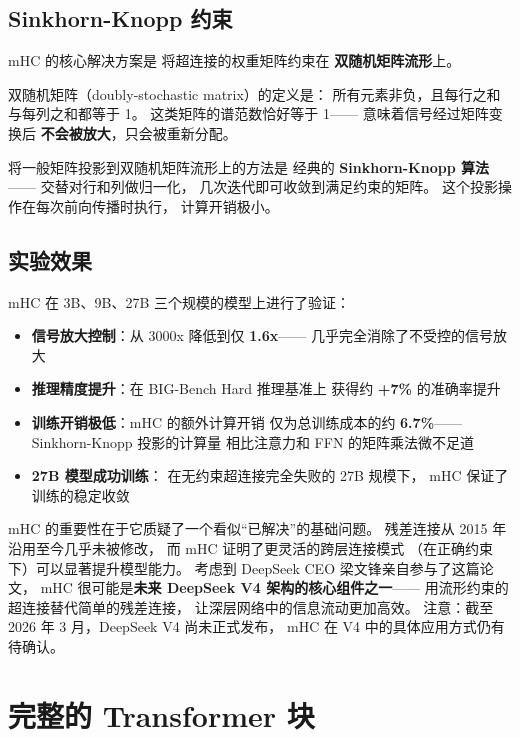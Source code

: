 \subsection{Sinkhorn-Knopp 约束}

mHC 的核心解决方案是
将超连接的权重矩阵约束在
\textbf{双随机矩阵流形}上。

双随机矩阵（doubly-stochastic matrix）的定义是：
所有元素非负，且每行之和与每列之和都等于 1。
这类矩阵的谱范数恰好等于 1——
意味着信号经过矩阵变换后
\textbf{不会被放大}，只会被重新分配。

将一般矩阵投影到双随机矩阵流形上的方法是
经典的 \textbf{Sinkhorn-Knopp 算法}——
交替对行和列做归一化，
几次迭代即可收敛到满足约束的矩阵。
这个投影操作在每次前向传播时执行，
计算开销极小。

\subsection{实验效果}

mHC 在 3B、9B、27B 三个规模的模型上进行了验证：

\begin{itemize}[noitemsep]
  \item \textbf{信号放大控制}：从 3000x 降低到仅 \textbf{1.6x}——
        几乎完全消除了不受控的信号放大
  \item \textbf{推理精度提升}：在 BIG-Bench Hard 推理基准上
        获得约 \textbf{+7\%} 的准确率提升
  \item \textbf{训练开销极低}：mHC 的额外计算开销
        仅为总训练成本的约 \textbf{6.7\%}——
        Sinkhorn-Knopp 投影的计算量
        相比注意力和 FFN 的矩阵乘法微不足道
  \item \textbf{27B 模型成功训练}：
        在无约束超连接完全失败的 27B 规模下，
        mHC 保证了训练的稳定收敛
\end{itemize}

\begin{corebox}
mHC 的重要性在于它质疑了一个看似``已解决''的基础问题。
残差连接从 2015 年沿用至今几乎未被修改，
而 mHC 证明了更灵活的跨层连接模式
（在正确约束下）可以显著提升模型能力。
考虑到 DeepSeek CEO 梁文锋亲自参与了这篇论文，
mHC 很可能是\textbf{未来 DeepSeek V4 架构的核心组件之一}——
用流形约束的超连接替代简单的残差连接，
让深层网络中的信息流动更加高效。
注意：截至 2026 年 3 月，DeepSeek V4 尚未正式发布，
mHC 在 V4 中的具体应用方式仍有待确认。
\end{corebox}

\section{完整的 Transformer 块}


